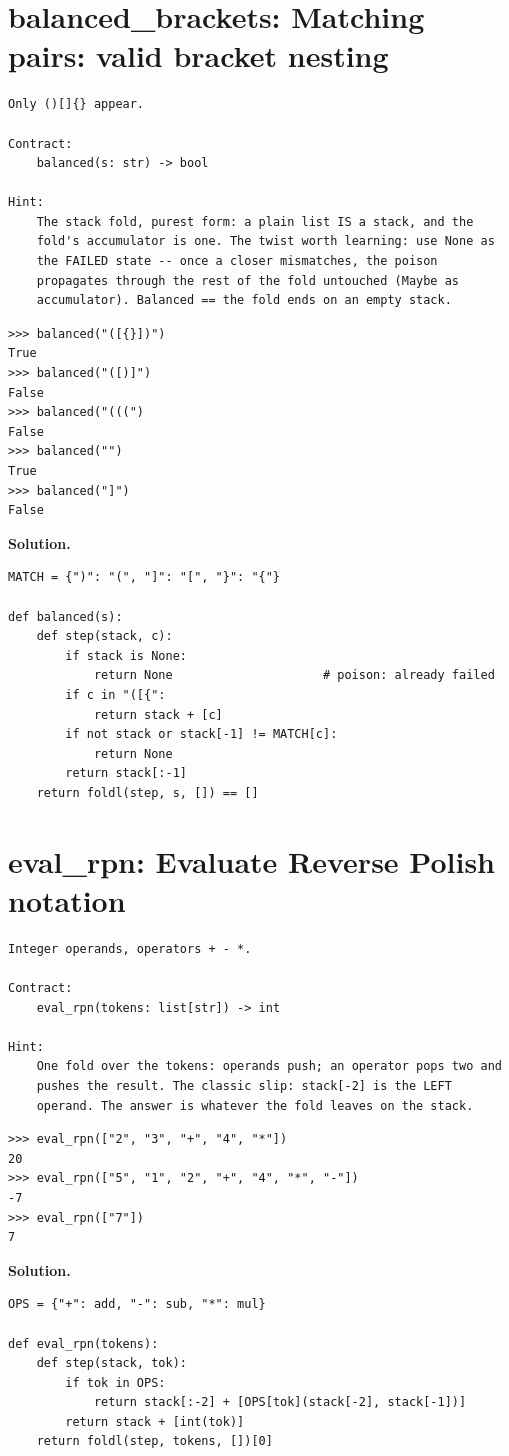 \documentclass[10pt,letterpaper]{book}
\begin{document}
\section{balanced\_brackets: Matching pairs: valid bracket nesting}
\begin{lstlisting}[style=ex]
Only ()[]{} appear.

Contract:
    balanced(s: str) -> bool

Hint:
    The stack fold, purest form: a plain list IS a stack, and the
    fold's accumulator is one. The twist worth learning: use None as
    the FAILED state -- once a closer mismatches, the poison
    propagates through the rest of the fold untouched (Maybe as
    accumulator). Balanced == the fold ends on an empty stack.
\end{lstlisting}
\begin{lstlisting}[style=ex]
>>> balanced("([{}])")
True
>>> balanced("([)]")
False
>>> balanced("(((")
False
>>> balanced("")
True
>>> balanced("]")
False
\end{lstlisting}
\noindent\textbf{Solution.}
\begin{lstlisting}[style=code]
MATCH = {")": "(", "]": "[", "}": "{"}

def balanced(s):
    def step(stack, c):
        if stack is None:
            return None                     # poison: already failed
        if c in "([{":
            return stack + [c]
        if not stack or stack[-1] != MATCH[c]:
            return None
        return stack[:-1]
    return foldl(step, s, []) == []
\end{lstlisting}

\section{eval\_rpn: Evaluate Reverse Polish notation}
\begin{lstlisting}[style=ex]
Integer operands, operators + - *.

Contract:
    eval_rpn(tokens: list[str]) -> int

Hint:
    One fold over the tokens: operands push; an operator pops two and
    pushes the result. The classic slip: stack[-2] is the LEFT
    operand. The answer is whatever the fold leaves on the stack.
\end{lstlisting}
\begin{lstlisting}[style=ex]
>>> eval_rpn(["2", "3", "+", "4", "*"])
20
>>> eval_rpn(["5", "1", "2", "+", "4", "*", "-"])
-7
>>> eval_rpn(["7"])
7
\end{lstlisting}
\noindent\textbf{Solution.}
\begin{lstlisting}[style=code]
OPS = {"+": add, "-": sub, "*": mul}

def eval_rpn(tokens):
    def step(stack, tok):
        if tok in OPS:
            return stack[:-2] + [OPS[tok](stack[-2], stack[-1])]
        return stack + [int(tok)]
    return foldl(step, tokens, [])[0]
\end{lstlisting}
\end{document}
